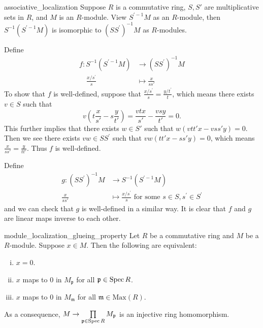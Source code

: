 \begin{proposition}{}{associative_localization}
    Suppose $R$ is a commutative ring, $S,S'$ are multiplicative sets in $R$, and $M$ is an $R$-module. View $S^{\prime-1} M$ as an $R$-module, then $S^{-1}\left(S^{\prime-1} M\right)$ is isomorphic to $\left(S S^{\prime}\right)^{-1} M$ as $R$-modules.
\end{proposition}

\begin{prf}
    Define 
    $$
    \begin{aligned}
     f: S^{-1}\left(S^{\prime-1} M\right) &\longrightarrow\left(S S^{\prime}\right)^{-1} M\\
     \quad \frac{x / s^{\prime}}{s} &\longmapsto\frac{x}{ss'} 
    \end{aligned}
    $$
    To show that $f$ is well-defined, suppose that $\frac{x/s^{\prime}}{s}=\frac{y/t^{\prime}}{t}$, which means there exists $v\in S$ such that 
    \[
        v\left(t\frac{x}{s'} - s\frac{y}{t'}\right)=\frac{vtx}{s'}-\frac{vsy}{t'}=0.
    \]
    This further implies that there exists $w\in S'$ such that $w(vtt'x-vss'y)=0$.
     Then we see there exists $vw\in S S^{\prime}$ such that $vw(tt'x-ss'y)=0$, which means $\frac{x}{ss'}=\frac{y}{tt'}$. Thus $f$ is well-defined.

    Define
     \[
    \begin{aligned}
     g:\left(S S^{\prime}\right)^{-1} M& \longrightarrow S^{-1}\left(S^{\prime-1} M\right)\\
      \frac{x}{ss'} &\longmapsto \frac{x / s^{\prime}}{s} \text { for some } s \in S, s^{\prime} \in S^{\prime}
    \end{aligned}
    \]
    and we can check that $g$ is well-defined in a similar way. It is clear that $f$ and $g$ are linear maps inverse to each other.
\end{prf}



\begin{proposition}{}{module_localization_glueing_property}
    Let $R$ be a commutative ring and $M$ be a $R$-module. Suppose $x\in M$. Then the following are equivalent:
    \begin{enumerate}[(i)]
        \item $x=0$.
        \item $x$ maps to $0$ in $M_{\mathfrak{p}}$ for all $\mathfrak{p}\in \operatorname{Spec}{R}$. 
        \item $x$ maps to $0$ in $M_{\mathfrak{m}}$ for all $\mathfrak{m}\in \mathrm{Max}\left(R\right)$. 
    \end{enumerate}
    As a consequence, $M\to \prod\limits_{\mathfrak{p}\in \operatorname{Spec}{R}}M_{\mathfrak{p}}$ is an injective ring homomorphism.
\end{proposition}

